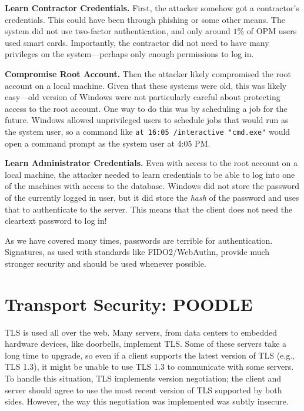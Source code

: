 \documentclass[
  letterpaper,
]{scrbook}
\theoremstyle{definition}
\theoremstyle{plain}
\theoremstyle{plain}
\theoremstyle{remark}
\begin{document}
\textbf{Learn Contractor Credentials.} First, the attacker somehow got a
contractor's credentials. This could have been through phishing or some
other means. The system did not use two-factor authentication, and only
around \(1\%\) of OPM users used smart cards. Importantly, the
contractor did not need to have many privileges on the system---perhaps
only enough permissions to log in.

\textbf{Compromise Root Account.} Then the attacker likely compromised
the root account on a local machine. Given that these systems were old,
this was likely easy---old version of Windows were not particularly
careful about protecting access to the root account. One way to do this
was by scheduling a job for the future. Windows allowed unprivileged
users to schedule jobs that would run as the system user, so a command
like \texttt{at\ 16:05\ /interactive\ "cmd.exe"} would open a command
prompt as the system user at 4:05 PM.

\textbf{Learn Administrator Credentials.} Even with access to the root
account on a local machine, the attacker needed to learn credentials to
be able to log into one of the machines with access to the database.
Windows did not store the password of the currently logged in user, but
it did store the \emph{hash} of the password and uses that to
authenticate to the server. This means that the client does not need the
cleartext password to log in!

As we have covered many times, passwords are terrible for
authentication. Signatures, as used with standards like FIDO2/WebAuthn,
provide much stronger security and should be used whenever possible.

\section{Transport Security: POODLE}\label{transport-security-poodle}

TLS is used all over the web. Many servers, from data centers to
embedded hardware devices, like doorbells, implement TLS. Some of these
servers take a long time to upgrade, so even if a client supports the
latest version of TLS (e.g., TLS 1.3), it might be unable to use TLS 1.3
to communicate with some servers. To handle this situation, TLS
implements version negotiation; the client and server should agree to
use the most recent version of TLS supported by both sides. However, the
way this negotiation was implemented was subtly insecure.
\end{document}

